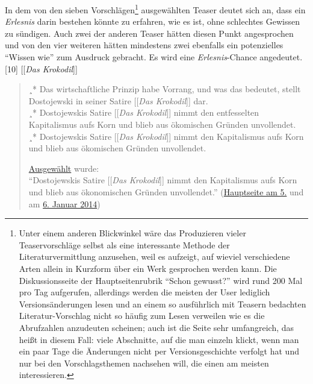 \documentclass[fontsize=12pt]{scrartcl}
\begin{document}
In dem von den sieben Vorschl\"agen\footnote{Unter einem anderen Blickwinkel w\"are das Produzieren vieler Teaservorschl\"age \mbox{selbst} als eine interessante Methode der Li\-te\-ra\-tur\-ver\-mitt\-lung anzusehen, weil es aufzeigt, auf wieviel verschiedene Arten allein in Kurzform \"uber ein Werk gesprochen werden kann. Die Dis\-kus\-si\-onsseite der Hauptsei\-tenrubrik "`Schon gewusst?"' wird rund 200 Mal pro Tag aufgerufen, al\-ler\-dings werden die meisten der \mbox{User} lediglich Versions\"anderungen lesen und an einem so ausf\"uhrlich mit Teasern bedachten Li\-te\-ra\-tur-Vorschlag nicht so h\"aufig zum Lesen verweilen wie es die Abrufzahlen anzudeuten scheinen; auch ist die Seite sehr umfangreich, das hei{\ss}t in diesem Fall: viele Abschnitte, auf die man einzeln klickt, wenn man ein paar Tage die \"Anderungen nicht per Versionsgeschichte verfolgt hat und nur bei den Vorschlagsthemen nachsehen will, die einen am meisten interessieren.} ausgew\"ahlten Teaser deutet sich an, dass ein \textit{Erlesnis} darin bestehen k\"onnte zu erfahren, wie es ist, ohne schlechtes Gewissen zu s\"undigen. Auch zwei der anderen Teaser h\"atten diesen Punkt an\-ge\-spro\-chen und von den \mbox{vier} weiteren h\"atten mindestens zwei ebenfalls ein potenzielles "`Wissen wie"' zum Ausdruck gebracht. Es wird eine \textit{Erlesnis}-Chance angedeutet.\\

[10] [[\textit{Das Krokodil}]]
\singlespacing
\begin{quote}
¸* Das wirtschaftliche Prinzip habe Vorrang, und was das bedeutet, stellt Dostojewski in seiner Satire [[\textit{Das Krokodil}]] dar.\\
¸* Dostojewskis Satire [[\textit{Das Krokodil}]] nimmt den entfessel\-ten Ka\-pi\-ta\-lis\-mus aufs Korn und blieb aus \"okomischen Gr\"unden unvollendet.\\
¸* Dostojewskis Satire [[\textit{Das Krokodil}]] nimmt den Ka\-pi\-ta\-lis\-mus aufs \mbox{Korn} und blieb aus \"okomischen Gr\"unden unvollendet.

\href{https://de.wikipedia.org/wiki/Wikipedia_Diskussion:Hauptseite/Schon_gewusst/Diskussionsarchiv/2013/Dezember#Vorschlag:_Das_Krokodil_.284._Dezember_2013.29__.28erl..29}{Ausgew\"ahlt} wurde:\\
"`Dostojewskis Satire [[\textit{Das Krokodil}]] nimmt den Kapitalis­mus aufs Korn und blieb aus \"okono­mischen Gr\"unden unvollendet."' (\href{https://de.wikipedia.org/wiki/Wikipedia:Hauptseite/Archiv/5._Januar_2014}{Hauptseite am 5.} und am \href{https://de.wikipedia.org/wiki/Wikipedia:Hauptseite/Archiv/6._Januar_2014}{6. Januar 2014})
\end{quote}
\onehalfspacing
\end{document}
